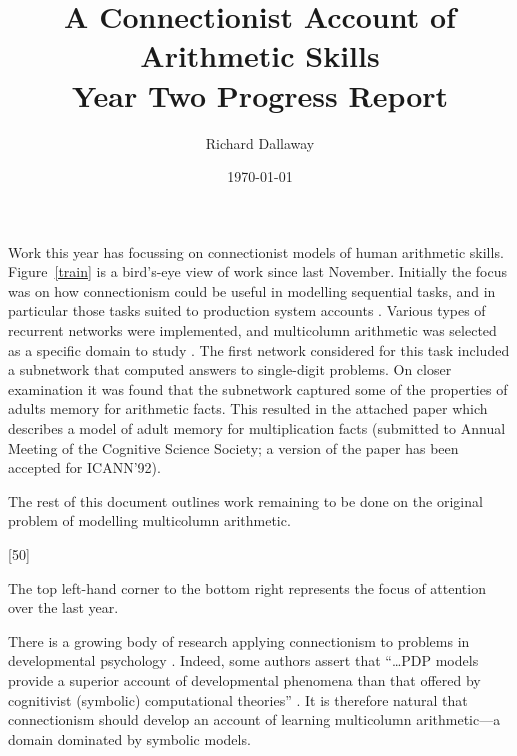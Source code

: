 


\author{Richard Dallaway}
\date{\today}
\title{A Connectionist Account of Arithmetic Skills\\Year Two
Progress Report}
\maketitle



Work this year has focussing
on connectionist models of human arithmetic
skills.
Figure~\ref{train} is a bird's-eye view of work since last November.
Initially the focus was on how connectionism could be useful in modelling
sequential tasks, and in particular those tasks suited to production system
accounts \cite{iot90}.  Various types of recurrent networks were
implemented, and multicolumn arithmetic was selected as a specific domain
to study \cite{iot91}.  The first network considered for this task included
a subnetwork that computed answers to single-digit problems. On closer
examination it was found that the subnetwork captured some of the
properties of adults memory for arithmetic facts. This resulted in the
attached paper which describes a model of adult memory for multiplication
facts (submitted to Annual Meeting of the Cognitive Science Society; a
version of the paper has been accepted for ICANN'92).

The rest of this document outlines work remaining to be done on the
original problem of modelling multicolumn arithmetic.

\begin{fancyfigure}
[50]\vspace{8cm}
\caption{The top left-hand corner to the bottom right represents the
focus of attention over the last year.}
\label{train}
\end{fancyfigure}


There is a growing body of research applying connectionism to
problems in developmental
psychology \cite{bateconn,elmaincr,balance,shulcasc,shulsimu}. Indeed, some
authors assert that ``\ldots PDP models provide a superior account of
developmental phenomena than that offered by cognitivist (symbolic)
computational theories'' \cite[p.~1]{plunconn}.  It is therefore natural
that connectionism should develop an account of learning multicolumn
arithmetic---a domain dominated by symbolic models.

